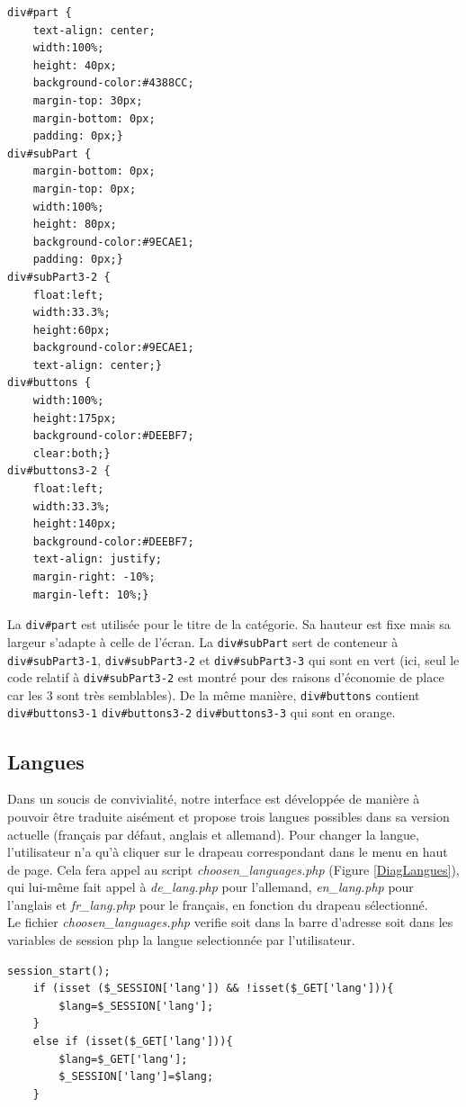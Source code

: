 \begin{DDbox}{\linewidth}
\begin{lstlisting}
div#part {
 	text-align: center;
	width:100%;
	height: 40px;
	background-color:#4388CC;
	margin-top: 30px;
	margin-bottom: 0px;
	padding: 0px;}
div#subPart {
	margin-bottom: 0px;
	margin-top: 0px;
	width:100%;
	height: 80px;
	background-color:#9ECAE1;
	padding: 0px;}
div#subPart3-2 {
	float:left;
	width:33.3%;
	height:60px;
	background-color:#9ECAE1;
	text-align: center;}
div#buttons {
	width:100%;
	height:175px;
	background-color:#DEEBF7;
	clear:both;}
div#buttons3-2 {
	float:left;
	width:33.3%;
	height:140px;
	background-color:#DEEBF7;
	text-align: justify;
	margin-right: -10%;
	margin-left: 10%;}
\end{lstlisting}
\end{DDbox}

La \texttt{div\#part} est utilisée pour le titre de la catégorie. Sa hauteur est fixe mais sa largeur s'adapte à celle de l'écran. La \texttt{div\#subPart} sert de conteneur à \texttt{div\#subPart3-1}, \texttt{div\#subPart3-2} et \texttt{div\#subPart3-3}  qui sont en vert (ici, seul le code relatif à \texttt{div\#subPart3-2} est montré pour des raisons d'économie de place car les 3 sont très semblables). De la même manière, \texttt{div\#buttons} contient \texttt{div\#buttons3-1} \texttt{div\#buttons3-2} \texttt{div\#buttons3-3} qui sont en orange. 

\subsection{Langues}
Dans un soucis de convivialité, notre interface est développée de manière à pouvoir être traduite aisément et propose trois langues possibles dans sa version actuelle (français par défaut, anglais et allemand). Pour changer la langue, l'utilisateur n'a qu'à cliquer sur le drapeau correspondant dans le menu en haut de page. Cela fera appel au script \emph{choosen\_languages.php} (Figure \ref{DiagLangues}), qui lui-même fait appel à \emph{de\_lang.php} pour l'allemand, \emph{en\_lang.php} pour l'anglais et \emph{fr\_lang.php} pour le français, en fonction du drapeau sélectionné. \\
Le fichier \emph{choosen\_languages.php} verifie  soit dans la barre d'adresse soit dans les variables de session php la langue selectionnée par l'utilisateur.\\

\begin{DDbox}{\linewidth}
\begin{lstlisting}
session_start();
	if (isset ($_SESSION['lang']) && !isset($_GET['lang'])){
		$lang=$_SESSION['lang'];
	}
	else if (isset($_GET['lang'])){
		$lang=$_GET['lang'];
		$_SESSION['lang']=$lang;
	}
\end{lstlisting}
\end{DDbox}\\

